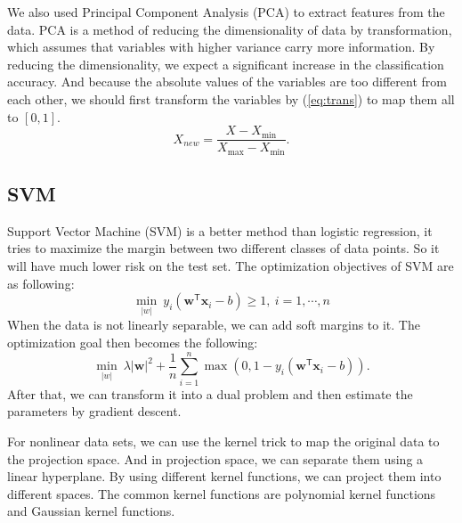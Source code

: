 \documentclass[11pt, a4paper, jou]{apa7}
\begin{document}
    We also used Principal Component Analysis (PCA)\cite{Pearson1901} to extract features from the data. PCA is a method of reducing the dimensionality of data by transformation, which assumes that variables with higher variance carry more information. By reducing the dimensionality, we expect a significant increase in the classification accuracy. And because the absolute values of the variables are too different from each other, we should first transform the variables by (\ref{eq:trans}) to map them all to $[0,1]$. 
    \begin{equation}
        \label{eq:trans}
        X_{new} = \frac{X - X_{\min}}{X_{\max}- X_{\min}}. 
    \end{equation}
\subsection{SVM}
    Support Vector Machine (SVM) is a better method than logistic regression, it tries to maximize the margin between two different classes of data points. So it will have much lower risk on the test set. The optimization objectives of SVM are as following:  
    \begin{equation}
        \min_{|w|}\ y_{i}(\mathbf {w} ^{\mathsf {T}}\mathbf {x} _{i}-b)\geq 1,\ i=1, \cdots, n
    \end{equation}
    When the data is not linearly separable, we can add soft margins to it. The optimization goal then becomes the following: 
    \begin{equation}
        \min_{|w|}\ \lambda |\mathbf {w}| ^{2}+{\frac {1}{n}}\sum _{i=1}^{n}\max \left(0,1-y_{i}(\mathbf {w} ^{\mathsf {T}}\mathbf {x} _{i}-b)\right). 
    \end{equation}
    After that, we can transform it into a dual problem and then estimate the parameters by gradient descent. 

    For nonlinear data sets, we can use the kernel trick to map the original data to the projection space. And in projection space, we can separate them using a linear hyperplane. By using different kernel functions, we can project them into different spaces. The common kernel functions are polynomial kernel functions and Gaussian kernel functions. 
\end{document}
